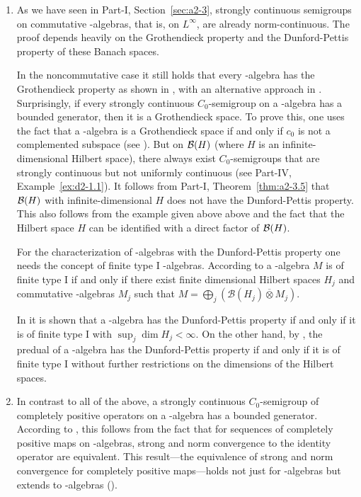 \begin{enumerate}
\item
As we have seen in Part-I, Section~\ref{sec:a2-3}, strongly continuous semigroups on commutative \WA-algebras, that is, on $L^{\infty}$, are already norm-continuous. 
The proof depends heavily on the Grothendieck property and the Dunford-Pettis property of these Banach spaces.

In the noncommutative case it still holds that every \WA-algebra has the Grothendieck property as shown in \textcite{zbmath00537321}, with an alternative approach in \textcite{zbmath00125315}.
Surprisingly, if every strongly continuous $C_{0}$-semigroup on a \CA-algebra has a bounded generator, then it is a Grothendieck space.
To prove this, one uses the fact that a \CA-algebra is a Grothendieck space if and only if $c_{0}$ is not a complemented subspace (see 
\textcite[Proposition 3.1.13 and Proposition 4.2.1]{zbmath07458830}).
But on $\mathcal{B}(H)$ (where $H$ is an infinite-dimensional Hilbert space), there always exist $C_{0}$-semigroups that are strongly continuous but not uniformly continuous (see Part-IV, Example~\ref{ex:d2-1.1}). 
It follows from Part-I, Theorem~\ref{thm:a2-3.5} that $\mathcal{B}(H)$ with infinite-dimensional $H$ 
does not have the Dunford-Pettis property. 
This also follows from the example given above above and the fact that the Hilbert space $H$ can be identified with a direct factor of $\mathcal{B}(H)$.

For the characterization of \WA-algebras with the Dunford-Pettis property one needs the  concept of finite type I \WA-algebras.
According to \textcite[Theorem V.1.27]{zbmath01692441} a \WA-algebra  $M$ is of finite type I if and only if there exist finite dimensional Hilbert spaces $H_{j}$ and commutative \WA-algebras $M_{j}$ such that 
$ M = \bigoplus_{j} ( \mathcal{B}(H_{j}) \overline{\otimes} M_{j} )$.

In \textcite{zbmath00125315} it is shown that a \WA-algebra has the Dunford-Pettis property if and only if it is of finite type I with $\sup_{j} \dim H_{j} < \infty$.
On the other hand, by \textcite{zbmath00097659}, the predual of a \WA-algebra has the Dunford-Pettis property if and only if it is of finite type I without further restrictions on the dimensions of the Hilbert spaces.

\item 
In contrast to all of the above, a strongly continuous $C_{0}$-semigroup of completely positive operators on a \WA-algebra has a bounded generator. 
According to \textcite{zbmath01495754}, this follows from the fact that for sequences of completely positive maps on \WA-algebras, strong and norm convergence to the identity operator are equivalent. 
This result---the equivalence of strong and norm convergence 
for completely positive maps---holds not just for \WA-algebras 
but extends to \AW-algebras (\textcite{zbmath01495754}).
\end{enumerate}

